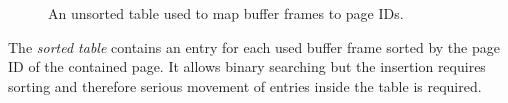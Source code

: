 \begin{@empty}

	\begin{figure}[ht!]
		\centering
		\caption{An unsorted table used to map buffer frames to page IDs.}
		\label{fig:unsortedTable}
	\end{figure}
\end{@empty}
	
	The \emph{sorted table} contains an entry for each used buffer frame sorted by the page ID of the contained page. It allows binary searching but the insertion requires sorting and therefore serious movement of entries inside the table is required.

